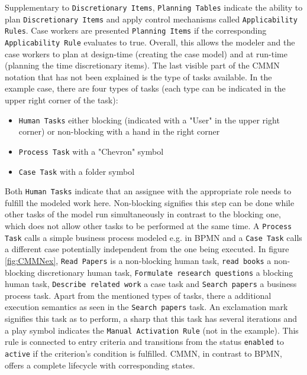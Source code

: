 Supplementary to \texttt{Discretionary Items}, \texttt{Planning Tables} indicate the ability to plan \texttt{Discretionary Items} and apply control mechanisms called \texttt{Applicability Rules}. Case workers are presented \texttt{Planning Items} if the corresponding \texttt{Applicability Rule} evaluates to true. Overall, this allows the modeler and the case workers to plan at design-time (creating the case model) and at run-time (planning the time discretionary items). 
The last visible part of the CMMN notation that has not been explained is the type of tasks available. In the example case, there are four types of tasks (each type can be indicated in the upper right corner of the task):
\begin{itemize}
\item \texttt{Human Tasks} either blocking (indicated with a "User" in the upper right corner) or non-blocking with a hand in the right corner
\item \texttt{Process Task} with a "Chevron" symbol 
\item \texttt{Case Task} with a folder symbol 
\end{itemize}

Both \texttt{Human Tasks} indicate that an assignee with the appropriate role needs to fulfill the modeled work here. Non-blocking signifies this step can be done while other tasks of the model run simultaneously in contrast to the blocking one, which does not allow other tasks to be performed at the same time. A \texttt{Process Task} calls a simple business process modeled e.g. in BPMN and a \texttt{Case Task} calls a different case potentially independent from the one being executed. In figure \ref{fig:CMMNex}, \texttt{Read Papers} is a non-blocking human task, \texttt{read books} a non-blocking discretionary human task, \texttt{Formulate research questions} a blocking human task, \texttt{Describe related work} a case task and \texttt{Search papers} a business process task.
Apart from the mentioned types of tasks, there a additional execution semantics as seen in the \texttt{Search papers} task. An exclamation mark signifies this task as to perform, a sharp that this task has several iterations and a play symbol indicates the \texttt{Manual Activation Rule} (not in the example). This rule is connected to entry criteria and transitions from the status \texttt{enabled} to \texttt{active} if the criterion's condition is fulfilled. 
CMMN, in contrast to BPMN, offers a complete lifecycle with corresponding states. 

